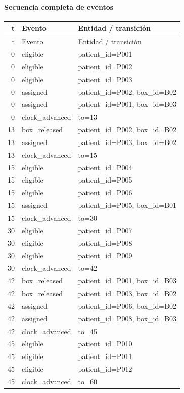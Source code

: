\paragraph{Secuencia completa de eventos}
\begin{longtable}{r p{2.2cm} p{4.2cm}}
\toprule t & Evento & Entidad / transición \\
\midrule\endfirsthead
\toprule t & Evento & Entidad / transición \\
\midrule\endhead
0 & eligible & patient\_id=P001 \\
0 & eligible & patient\_id=P002 \\
0 & eligible & patient\_id=P003 \\
0 & assigned & patient\_id=P002, box\_id=B02 \\
0 & assigned & patient\_id=P001, box\_id=B03 \\
0 & clock\_advanced & to=13 \\
13 & box\_released & patient\_id=P002, box\_id=B02 \\
13 & assigned & patient\_id=P003, box\_id=B02 \\
13 & clock\_advanced & to=15 \\
15 & eligible & patient\_id=P004 \\
15 & eligible & patient\_id=P005 \\
15 & eligible & patient\_id=P006 \\
15 & assigned & patient\_id=P005, box\_id=B01 \\
15 & clock\_advanced & to=30 \\
30 & eligible & patient\_id=P007 \\
30 & eligible & patient\_id=P008 \\
30 & eligible & patient\_id=P009 \\
30 & clock\_advanced & to=42 \\
42 & box\_released & patient\_id=P001, box\_id=B03 \\
42 & box\_released & patient\_id=P003, box\_id=B02 \\
42 & assigned & patient\_id=P006, box\_id=B02 \\
42 & assigned & patient\_id=P008, box\_id=B03 \\
42 & clock\_advanced & to=45 \\
45 & eligible & patient\_id=P010 \\
45 & eligible & patient\_id=P011 \\
45 & eligible & patient\_id=P012 \\
45 & clock\_advanced & to=60 \\

\end{longtable}
